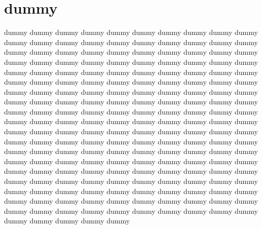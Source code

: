 \section{dummy}
dummy dummy dummy dummy dummy dummy dummy dummy dummy dummy dummy dummy dummy dummy dummy dummy dummy dummy dummy dummy dummy dummy dummy dummy dummy dummy dummy dummy dummy dummy dummy dummy dummy dummy dummy dummy dummy dummy dummy dummy dummy dummy dummy dummy dummy dummy dummy dummy dummy dummy dummy dummy dummy dummy dummy dummy dummy dummy dummy dummy dummy dummy dummy dummy dummy dummy dummy dummy dummy dummy dummy dummy dummy dummy dummy dummy dummy dummy dummy dummy dummy dummy dummy dummy dummy dummy dummy dummy dummy dummy dummy dummy dummy dummy dummy dummy dummy dummy dummy dummy dummy dummy dummy dummy dummy dummy dummy dummy dummy dummy dummy dummy dummy dummy dummy dummy dummy dummy dummy dummy dummy dummy dummy dummy dummy dummy dummy dummy dummy dummy dummy dummy dummy dummy dummy dummy dummy dummy dummy dummy dummy dummy dummy dummy dummy dummy dummy dummy dummy dummy dummy dummy dummy dummy dummy dummy dummy dummy dummy dummy dummy dummy dummy dummy dummy dummy dummy dummy dummy dummy dummy dummy dummy dummy dummy dummy dummy dummy dummy dummy dummy dummy dummy dummy dummy dummy dummy dummy dummy dummy dummy dummy dummy dummy dummy
